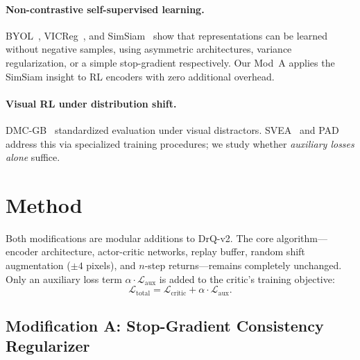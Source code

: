 \documentclass{article}
\begin{document}
\paragraph{Non-contrastive self-supervised learning.}
BYOL~\citep{grill2020bootstrap}, VICReg~\citep{bardes2022vicreg}, and SimSiam~\citep{chen2021exploring} show that representations can be learned without negative samples, using asymmetric architectures, variance regularization, or a simple stop-gradient respectively.
Our Mod~A applies the SimSiam insight to RL encoders with zero additional overhead.

\paragraph{Visual RL under distribution shift.}
DMC-GB~\citep{hansen2021softda} standardized evaluation under visual distractors.
SVEA~\citep{hansen2021stabilizing} and PAD~\citep{hansen2022pre} address this via specialized training procedures; we study whether \emph{auxiliary losses alone} suffice.

\section{Method}
\label{sec:method}

Both modifications are modular additions to DrQ-v2.
The core algorithm---encoder architecture, actor-critic networks, replay buffer, random shift augmentation ($\pm4$ pixels), and $n$-step returns---remains completely unchanged.
Only an auxiliary loss term $\alpha \cdot \mathcal{L}_{\text{aux}}$ is added to the critic's training objective:
\begin{equation}
  \mathcal{L}_{\text{total}} = \mathcal{L}_{\text{critic}} + \alpha \cdot \mathcal{L}_{\text{aux}}.
\end{equation}

\subsection{Modification A: Stop-Gradient Consistency Regularizer}
\end{document}
